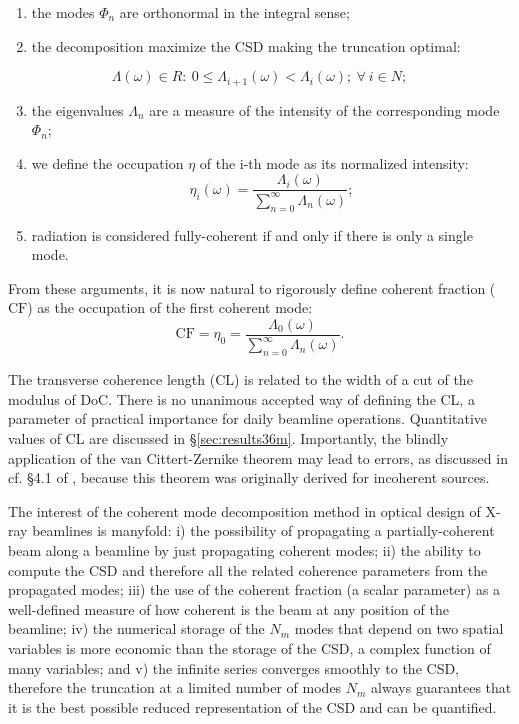 \documentclass{iucr}              %
\begin{document}
\begin{enumerate}%
\item the modes $\Phi_n$ are orthonormal in the integral sense;
\item the decomposition maximize the CSD making the truncation optimal:
\end{enumerate}
\begin{equation*}
\Lambda(\omega) \in {R}
:~0\leq \Lambda_{i+1}(\omega)<\Lambda_i(\omega);~\forall~i \in {N};
\end{equation*}
\begin{enumerate}%
\setcounter{enumi}{2}
\item the eigenvalues $\Lambda_n$ are a measure of the intensity of the corresponding mode $\Phi_{n}$; 
\item we define the occupation $\eta$ of the i-th mode as its normalized intensity: 
\begin{equation}
\eta_i(\omega) =\frac{\Lambda_i(\omega)}{\sum\limits_{n=0}^\infty{\Lambda_n(\omega)}};
\end{equation}
\item radiation is considered fully-coherent if and only if there is only a single mode.
\end{enumerate}

From these arguments, it is now natural to rigorously define coherent fraction ($\text{CF}$) as the occupation of the first coherent mode:
\begin{equation}
\text{CF}=\eta_0=\frac{\Lambda_0(\omega)}{\sum\limits_{n=0}^\infty{\Lambda_n(\omega)}}. \label{eq:CF2D}
\end{equation}

The transverse coherence length (CL) is related to the width of a cut of the modulus of DoC. There is no unanimous accepted way of defining the CL, a parameter of practical importance for daily beamline operations. Quantitative values of CL are discussed in \S{\ref{sec:results36m}}. Importantly, the blindly application of the van Cittert-Zernike theorem may lead to errors, as discussed in cf. §4.1 of \cite{geloni2008}, because this theorem was originally derived for incoherent sources. 

The interest of the coherent mode decomposition method in optical design of X-ray beamlines is manyfold: 
i) the possibility of propagating a partially-coherent beam along a beamline by just propagating coherent modes; 
ii) the ability to compute the CSD and therefore all the related coherence parameters from the propagated modes;
iii) the use of the coherent fraction (a scalar parameter) as a well-defined measure of how coherent is the beam at any position of the beamline;
iv) the numerical storage of the $N_m$ modes that depend on two spatial variables is more economic than the storage of the CSD, a complex function of many variables;
and v) the infinite series converges smoothly to the CSD, therefore the truncation at a limited number of modes $N_m$ always guarantees that it is the best possible reduced representation of the CSD and can be quantified.
\end{document}
